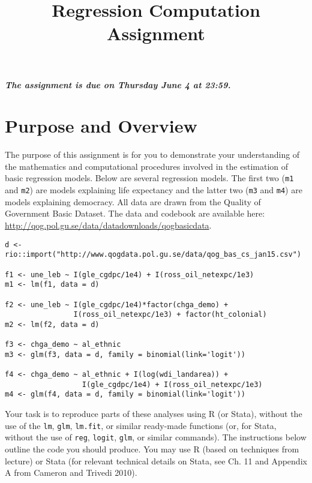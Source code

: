\documentclass[a4paper,12pt]{article}
\title{Regression Computation Assignment}
\author{}
\date{}
\begin{document}
\vspace{-5em}

\maketitle

\vspace{-3em}

{\begin{center}\textit{\textbf{The assignment is due on Thursday June 4 at 23:59.}}\end{center}}

{\onehalfspacing

\section*{Purpose and Overview}

The purpose of this assignment is for you to demonstrate your understanding of the mathematics and computational procedures involved in the estimation of basic regression models. Below are several regression models. The first two (\texttt{m1} and \texttt{m2}) are models explaining life expectancy and the latter two (\texttt{m3} and \texttt{m4}) are models explaining democracy. All data are drawn from the Quality of Government Basic Dataset. The data and codebook are available here: \url{http://qog.pol.gu.se/data/datadownloads/qogbasicdata}.

\begin{lstlisting}
d <- rio::import("http://www.qogdata.pol.gu.se/data/qog_bas_cs_jan15.csv")

f1 <- une_leb ~ I(gle_cgdpc/1e4) + I(ross_oil_netexpc/1e3)
m1 <- lm(f1, data = d)

f2 <- une_leb ~ I(gle_cgdpc/1e4)*factor(chga_demo) + 
                I(ross_oil_netexpc/1e3) + factor(ht_colonial)
m2 <- lm(f2, data = d)

f3 <- chga_demo ~ al_ethnic
m3 <- glm(f3, data = d, family = binomial(link='logit'))

f4 <- chga_demo ~ al_ethnic + I(log(wdi_landarea)) + 
                  I(gle_cgdpc/1e4) + I(ross_oil_netexpc/1e3)
m4 <- glm(f4, data = d, family = binomial(link='logit'))
\end{lstlisting}

\vspace{1em}
\noindent Your task is to reproduce parts of these analyses using R (or Stata), without the use of the \texttt{lm}, \texttt{glm}, \texttt{lm.fit}, or similar ready-made functions (or, for Stata, without the use of \texttt{reg}, \texttt{logit}, \texttt{glm}, or similar commands). The instructions below outline the code you should produce. You may use R (based on techniques from lecture) or Stata (for relevant technical details on Stata, see Ch. 11 and Appendix A from Cameron and Trivedi 2010).
}
\end{document}

